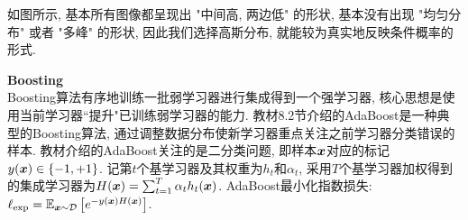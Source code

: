 \documentclass[answers]{exam}  %
\begin{document}
\begin{questions}
\begin{solution}
\begin{enumerate}
            如图所示, 基本所有图像都呈现出 "中间高, 两边低" 的形状, 基本没有出现 "均匀分布" 或者 "多峰" 的形状, 因此我们选择高斯分布, 就能较为真实地反映条件概率的形式.
    \end{enumerate}
  \end{solution}
  \question [20] \textbf{Boosting} \\
  Boosting算法有序地训练一批弱学习器进行集成得到一个强学习器, 核心思想是使用当前学习器``提升"已训练弱学习器的能力. 教材8.2节介绍的AdaBoost是一种典型的Boosting算法, 通过调整数据分布使新学习器重点关注之前学习器分类错误的样本. 教材介绍的AdaBoost关注的是二分类问题, 即样本${\boldsymbol{x}}$对应的标记$y({\boldsymbol{x}})\in \{-1, +1\}$. 记第$t$个基学习器及其权重为$h_t$和$\alpha_t$, 采用$T$个基学习器加权得到的集成学习器为$H({\boldsymbol{x}})=\sum_{t=1}^T \alpha_t h_t({\boldsymbol{x}})$. AdaBoost最小化指数损失: $\ell_{\text{exp}}=\mathbb{E}_{{\boldsymbol{x}} \sim \mathcal{D}}\left[ e^{-y({\boldsymbol{x}})H({\boldsymbol{x}})} \right]$.




\end{questions}
\end{document}
